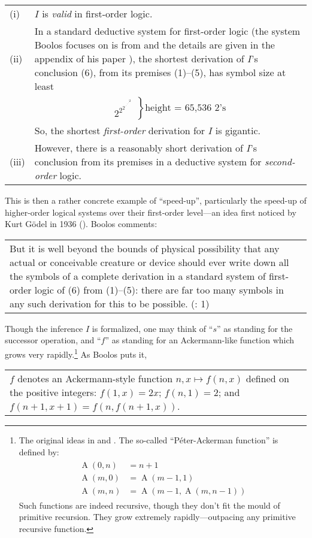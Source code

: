 \documentclass[11pt,a4paper]{article}
\newcommand{\ben}{\begin{equation*}}
\newcommand{\een}{\end{equation*}}
\newcommand{\beqn}{\begin{eqnarray*}}
\newcommand{\eeqn}{\end{eqnarray*}}
\newcommand{\bt}[2]{\small \begin{center}\begin{tabular}{p{#1 cm}p{#2 cm}}}
\def\et{\end{tabular}\end{center}\normalsize}
\theoremstyle{definition}
\begin{document}
\bt{1}{10}
(i) & $I$ is \emph{valid} in first-order logic.\\
(ii) & In a standard deductive system for first-order logic (the system Boolos focuses on is from \cite{mat72} and the details are given in the appendix of his paper \cite{boo87}), the shortest derivation of $I$'s conclusion (6), from its premises (1)--(5), has symbol size at least \\
& \ben
\left.
\begin{array}{l}
 2^{2^{2^{.^{.^{.^{.^{2}}}}}}} 
 \end{array}
 \right\} \text{height = 65,536 2's}
\een \\
& So, the shortest \emph{first-order} derivation for $I$ is gigantic.\\
(iii) & However, there is a reasonably short derivation of $I$'s conclusion from its premises in a deductive system for \emph{second-order} logic.
\et

This is then a rather concrete example of “speed-up”, particularly the speed-up of higher-order logical systems over their first-order level---an idea first noticed by Kurt G\"{o}del in 1936 (\cite{god36}). Boolos comments:

\bt{12}{0}
But it is well beyond the bounds of physical possibility that any actual or conceivable creature or device should ever write down all the symbols of a complete derivation in a standard system of first-order logic of (6) from (1)--(5): there are far too many symbols in any such derivation for this to be possible. (\cite{boo87}: 1) 
\et
 
Though the inference $I$ is formalized, one may think of ``$s$'' as standing for the successor operation, and ``$f$'' as standing for an Ackermann-like function which grows very rapidly.\footnote{The original ideas in \cite{ack28} and \cite{pet35}. The so-called ``P\'{e}ter-Ackerman function'' is defined by:
\beqn
{\displaystyle {\begin{aligned}\operatorname {A} (0,n)&=n+1\\\operatorname {A} (m,0)&=\operatorname {A} (m-1,1)\\\operatorname {A} (m,n)&=\operatorname {A} (m-1,\operatorname {A} (m,n-1))\end{aligned}}}
\eeqn
Such functions are indeed recursive, though they don't fit the mould of primitive recursion. They grow extremely rapidly---outpacing any primitive recursive function.
} As Boolos puts it, 

\bt{12}{0}
$f$ denotes an Ackermann-style function $n,x \mapsto f(n, x)$ defined on the positive integers: $f(1, x) = 2x$; $f(n, 1) = 2$; and $f(n + 1, x + 1) = f(n, f(n + 1, x))$.
\et
\end{document}

